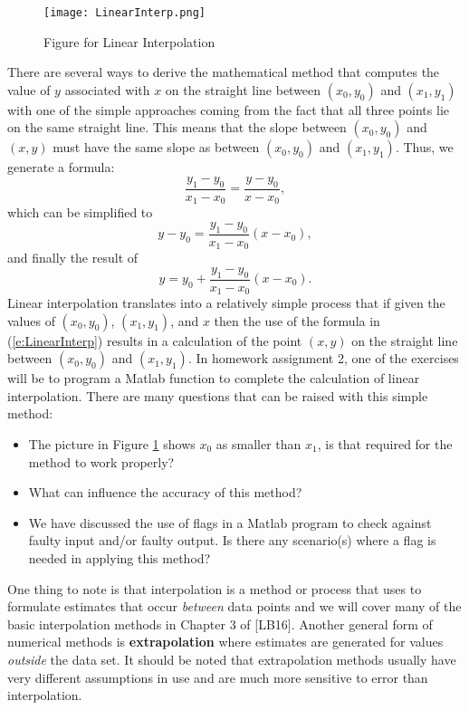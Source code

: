\documentclass[twoside]{article}
\renewcommand{\cite}[1]{[#1]}
\def\ds{\displaystyle}
\begin{document}
\begin{figure}[!ht]
\centering
\texttt{[image: LinearInterp.png]}
 \caption{Figure for Linear Interpolation}
 \label{f:LinearInterp}
\end{figure}
There are several ways to derive the mathematical method that computes the value of $y$ associated with $x$ on the straight line between $\ds (x_0,y_0)$ and $\ds (x_1,y_1)$ with one of the simple approaches coming from the fact that all three points lie on the same straight line. This means that the slope between $\ds (x_0,y_0)$ and $(x,y)$ must have the same slope as between $\ds (x_0,y_0)$ and $\ds (x_1,y_1)$. Thus, we generate a formula:
$$\frac {y_1-y_0}{x_1-x_0} = \frac {y-y_0}{x-x_0}, $$
which can be simplified to
$$y-y_0 = \frac {y_1-y_0}{x_1-x_0}(x-x_0), $$
and finally the result of
\begin{equation}
y = y_0 + \frac {y_1-y_0}{x_1-x_0}(x-x_0).    
  \label{e:LinearInterp}  
\end{equation}
Linear interpolation translates into a relatively simple process that if given the values of $\ds (x_0,y_0)$,  $\ds (x_1,y_1)$, and $x$ then the use of the formula in (\ref{e:LinearInterp}) results in a calculation of the point $(x,y)$ on the straight line between $\ds (x_0,y_0)$ and  $\ds (x_1,y_1)$. In homework assignment 2, one of the exercises will be to program a Matlab function to complete the calculation of linear interpolation. There are many questions that can be raised with this simple method: \begin{itemize}
    \item The picture in Figure \ref{f:LinearInterp} shows $\ds x_0$ as smaller than $\ds x_1$, is that required for the method to work properly?
    \item What can influence the accuracy of this method?
    \item We have discussed the use of flags in a Matlab program to check against faulty input and/or faulty output. Is there any scenario(s) where a flag is needed in applying this method?
\end{itemize}
One thing to note is that interpolation is a method or process that uses to formulate estimates that occur {\it between} data points and we will cover many of the basic interpolation methods in Chapter 3 of \cite{LB16}. Another general form of numerical methods is {\bf extrapolation} where estimates are generated for values {\it outside} the data set. It should be noted that extrapolation methods usually have very different assumptions in use and are much more sensitive to error than interpolation. 
\end{document}
